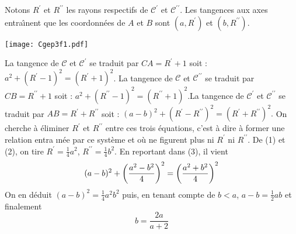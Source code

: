 
Notons $R^{\prime }$ et $R^{\prime \prime }$ les rayons respectifs de $%
\mathcal{C}^{\prime }$ et $\mathcal{C}^{\prime \prime }$. Les
tangences aux
axes entra\^{\i }nent que les coordonn{\'e}es de $A$ et $B$ sont $%
(a,R^{\prime })$ et $(b,R^{\prime \prime })$.

\begin{floatingfigure}{7cm}
  \texttt{[image: Cgep3f1.pdf]}
  \caption{$a=3, b=\frac{6}{5}$}
\end{floatingfigure}

La tangence de $\mathcal{C}$ et $\mathcal{C}^{\prime }$ se traduit par $%
CA=R^{\prime }+1$ soit : $a^{2}+(R^{\prime }-1)^{2}=(R^{\prime }+1)^{2}$.%
\newline
La tangence de $\mathcal{C}$ et $\mathcal{C}^{\prime \prime }$ se
traduit par $CB=R^{\prime \prime }+1$ soit : $a^{2}+(R^{\prime
\prime }-1)^{2}=(R^{\prime \prime }+1)^{2}$.\newline La tangence
de $\mathcal{C}^{\prime }$ et $\mathcal{C}^{\prime \prime }$ se
traduit par $AB=R^{\prime }+R^{\prime \prime }$ soit :
$(a-b)^{2}+(R^{\prime }-R^{\prime \prime })^{2}=(R^{\prime
}+R^{\prime \prime })^{2}.$ \newline On cherche {\`a} {\'e}liminer
$R^{\prime }$ et $R^{\prime \prime }$ entre
ces trois {\'e}quations, c'est {\`a} dire {\`a} former une relation entra\^{%
\i }n{\'e}e par ce syst{\`e}me et o{\`u} ne figurent plus ni $R^{\prime }$ ni
$R^{\prime \prime }$. De (1) et (2), on tire $R^{\prime
}=\frac{1}{4}a^{2} $, $R^{\prime \prime }=\frac{1}{4}b^{2}$. En
reportant dans (3), il vient
\[
(a-b)^{2}+\left( \frac{a^{2}-b^{2}}{4}\right) ^{2}=\left( \frac{a^{2}+b^{2}}{%
4}\right) ^{2}
\]
On en d{\'e}duit $(a-b)^{2}=\frac{1}{4}a^{2}b^{2}$ puis, en tenant
compte de $b<a$, $a-b=\frac{1}{2}ab$ et finalement
\[
b=\frac{2a}{a+2}
\]
